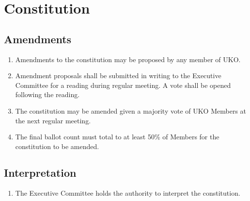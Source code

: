 \documentclass[12pt,executivepaper]{article}
\begin{document}
\section{Constitution}

\subsection{Amendments}
\begin{enumerate}
    \item Amendments to the constitution may be proposed by any member of UKO.
    \item Amendment proposals shall be submitted in writing to the Executive
          Committee for a reading during regular meeting. A vote shall be
          opened following the reading.
    \item The constitution may be amended given a majority vote of UKO Members
          at the next regular meeting.
    \item The final ballot count must total to at least 50\% of Members for the
          constitution to be amended.
\end{enumerate}

\subsection{Interpretation}
\begin{enumerate}
    \item The Executive Committee holds the authority to interpret the
          constitution.
\end{enumerate}
\end{document}
